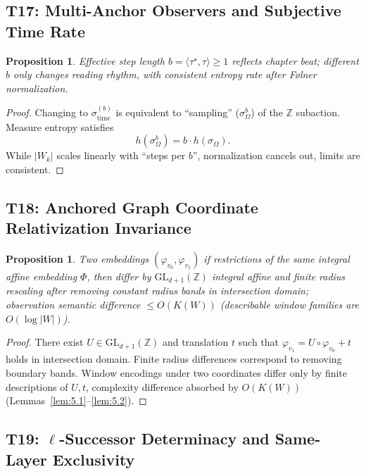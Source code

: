 \documentclass[11pt]{article}
\newtheorem{proposition}[theorem]{Proposition}
\theoremstyle{definition}
\theoremstyle{remark}
\begin{document}
\subsection{T17: Multi-Anchor Observers and Subjective Time Rate}

\begin{proposition}\label{thm:T17}
Effective step length \( b = \langle \tau^\star, \tau \rangle \geq 1 \) reflects chapter beat; different \( b \) only changes reading rhythm, with consistent entropy rate after Følner normalization.
\end{proposition}

\begin{proof}
Changing to \( \sigma_{\mathrm{time}}^{(b)} \) is equivalent to ``sampling'' (\( \sigma_\Omega^b \)) of the \( \mathbb{Z} \) subaction. Measure entropy satisfies
\[
h(\sigma_\Omega^b) = b \cdot h(\sigma_\Omega).
\]
While \( |W_k| \) scales linearly with ``steps per \( b \)'', normalization cancels out, limits are consistent.
\end{proof}

\subsection{T18: Anchored Graph Coordinate Relativization Invariance}

\begin{proposition}\label{thm:T18}
Two embeddings \( (\varphi_{v_0}, \varphi_{v_1}) \) if restrictions of the same integral affine embedding \( \Phi \), then differ by \( \mathrm{GL}_{d+1}(\mathbb{Z}) \) integral affine and finite radius rescaling after removing constant radius bands in intersection domain; observation semantic difference \( \leq O(K(W)) \) (describable window families are \( O(\log |W|) \)).
\end{proposition}

\begin{proof}
There exist \( U \in \mathrm{GL}_{d+1}(\mathbb{Z}) \) and translation \( t \) such that \( \varphi_{v_1} = U \circ \varphi_{v_0} + t \) holds in intersection domain. Finite radius differences correspond to removing boundary bands. Window encodings under two coordinates differ only by finite descriptions of \( U, t \), complexity difference absorbed by \( O(K(W)) \) (Lemmas~\ref{lem:5.1}--\ref{lem:5.2}).
\end{proof}

\subsection{T19: \(\ell\)-Successor Determinacy and Same-Layer Exclusivity}
\end{document}

